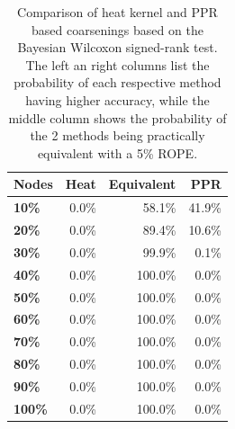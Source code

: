 \begin{table}
  \caption{Comparison of heat kernel and PPR based coarsenings based on the Bayesian Wilcoxon signed-rank test. The left an right columns list the probability of each respective method having higher accuracy, while the middle column shows the probability of the 2 methods being practically equivalent with a 5\% ROPE.}
  \label{tab:bayesian-heat-ppr}
  \centering
  \begin{tabular}{lrrr}
    \toprule
    \textbf{Nodes} & \textbf{Heat} & \textbf{Equivalent} & \textbf{PPR} \\
    \midrule
    \textbf{10\%}  & 0.0\%         & 58.1\%            & 41.9\%         \\
    \textbf{20\%}  & 0.0\%         & 89.4\%            & 10.6\%         \\
    \textbf{30\%}  & 0.0\%         & 99.9\%            & 0.1\%         \\
    \textbf{40\%}  & 0.0\%         & 100.0\%           & 0.0\%          \\
    \textbf{50\%}  & 0.0\%         & 100.0\%           & 0.0\%          \\
    \textbf{60\%}  & 0.0\%         & 100.0\%           & 0.0\%          \\
    \textbf{70\%}  & 0.0\%         & 100.0\%           & 0.0\%          \\
    \textbf{80\%}  & 0.0\%         & 100.0\%           & 0.0\%          \\
    \textbf{90\%}  & 0.0\%         & 100.0\%           & 0.0\%          \\
    \textbf{100\%} & 0.0\%         & 100.0\%           & 0.0\%          \\
    \bottomrule
  \end{tabular}
\end{table}
